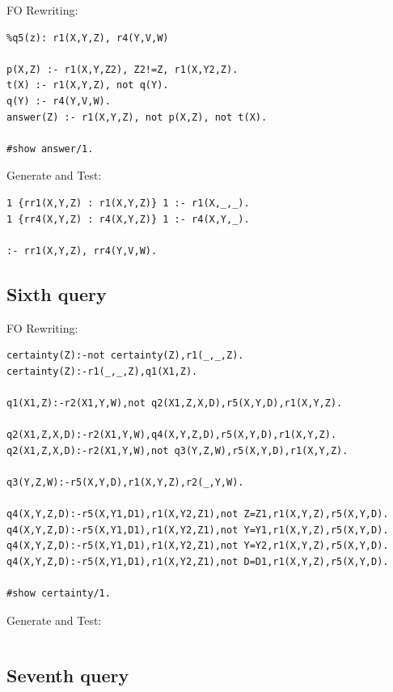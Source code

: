 \documentclass[acmsmall]{acmart}
\begin{document}
\begin{CCSXML}
FO Rewriting:
\begin{lstlisting}
%q5(z): r1(X,Y,Z), r4(Y,V,W)

p(X,Z) :- r1(X,Y,Z2), Z2!=Z, r1(X,Y2,Z).
t(X) :- r1(X,Y,Z), not q(Y).
q(Y) :- r4(Y,V,W).
answer(Z) :- r1(X,Y,Z), not p(X,Z), not t(X).

#show answer/1.
\end{lstlisting}

Generate and Test:
\begin{lstlisting}
1 {rr1(X,Y,Z) : r1(X,Y,Z)} 1 :- r1(X,_,_).
1 {rr4(X,Y,Z) : r4(X,Y,Z)} 1 :- r4(X,Y,_).

:- rr1(X,Y,Z), rr4(Y,V,W).

\end{lstlisting}



\subsection{Sixth query}

FO Rewriting:
\begin{lstlisting}
certainty(Z):-not certainty(Z),r1(_,_,Z).
certainty(Z):-r1(_,_,Z),q1(X1,Z).

q1(X1,Z):-r2(X1,Y,W),not q2(X1,Z,X,D),r5(X,Y,D),r1(X,Y,Z).

q2(X1,Z,X,D):-r2(X1,Y,W),q4(X,Y,Z,D),r5(X,Y,D),r1(X,Y,Z).
q2(X1,Z,X,D):-r2(X1,Y,W),not q3(Y,Z,W),r5(X,Y,D),r1(X,Y,Z).

q3(Y,Z,W):-r5(X,Y,D),r1(X,Y,Z),r2(_,Y,W).

q4(X,Y,Z,D):-r5(X,Y1,D1),r1(X,Y2,Z1),not Z=Z1,r1(X,Y,Z),r5(X,Y,D).
q4(X,Y,Z,D):-r5(X,Y1,D1),r1(X,Y2,Z1),not Y=Y1,r1(X,Y,Z),r5(X,Y,D).
q4(X,Y,Z,D):-r5(X,Y1,D1),r1(X,Y2,Z1),not Y=Y2,r1(X,Y,Z),r5(X,Y,D).
q4(X,Y,Z,D):-r5(X,Y1,D1),r1(X,Y2,Z1),not D=D1,r1(X,Y,Z),r5(X,Y,D).

#show certainty/1.
\end{lstlisting}

Generate and Test:
\begin{lstlisting}
\end{lstlisting}



\subsection{Seventh query}


\end{CCSXML}
\end{document}
